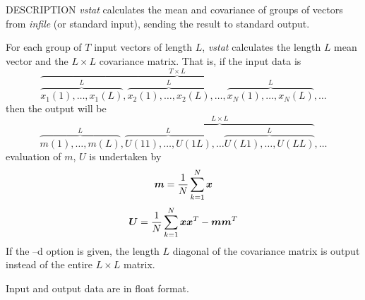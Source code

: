 \begin{qsection}{DESCRIPTION}
{\em vstat} calculates the mean and covariance of groups of vectors 
from {\em infile} (or standard input), 
sending the result to standard output.

For each group of $T$ input vectors of length $L$, 
{\em vstat} calculates the length $L$ mean vector 
and the $L\times L$ covariance matrix. 
That is, if the input data is
\begin{displaymath}
\overbrace{
  \overbrace{x_1(1),\ldots,x_1(L)}^{L},
  \overbrace{x_2(1),\ldots,x_2(L)}^{L},\ldots,
  \overbrace{x_N(1),\ldots,x_N(L)}^{L}
}^{T \times L},\ldots
\end{displaymath}
then the output will be 
\begin{displaymath}
  \overbrace{m(1),\ldots,m(L)}^L, 
  \overbrace{
    \overbrace{U(11),\ldots,U(1L)}^L, \ldots
    \overbrace{U(L1),\ldots,U(LL)}^L
  }^{L\times L}, \ldots
\end{displaymath}
evaluation of {\boldmath $m$}, {\boldmath $U$} is undertaken by
\begin{displaymath}
  \mbox{\boldmath $m$} = \frac{1}{N}\sum_{k=1}^{N} \mbox{\boldmath $x$}
\end{displaymath}
\begin{displaymath}
  \mbox{\boldmath $U$} = \frac{1}{N}\sum_{k=1}^{N}
	\mbox{\boldmath $x$} \mbox{\boldmath $x$}^T
	- \mbox{\boldmath $m$} \mbox{\boldmath $m$}^T
\end{displaymath}
If the --d option is given, 
the length $L$ diagonal of the covariance matrix is output 
instead of the entire $L\times L$ matrix.

Input and output data are in float format.
\end{qsection}

\begin{options}
\end{options}

